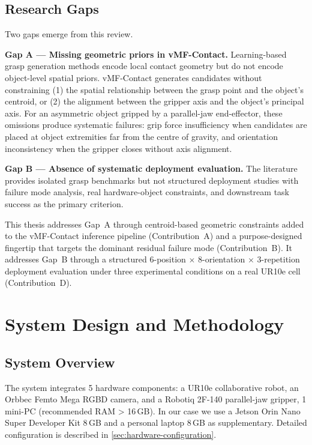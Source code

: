\documentclass[12pt, a4paper]{report}
\begin{document}
\section{Research Gaps}
\label{sec:research-gaps}

Two gaps emerge from this review.

\textbf{Gap A --- Missing geometric priors in vMF-Contact.} Learning-based grasp generation methods encode local contact geometry but do not encode object-level spatial priors. vMF-Contact generates candidates without constraining (1) the spatial relationship between the grasp point and the object's centroid, or (2) the alignment between the gripper axis and the object's principal axis. For an asymmetric object gripped by a parallel-jaw end-effector, these omissions produce systematic failures: grip force insufficiency when candidates are placed at object extremities far from the centre of gravity, and orientation inconsistency when the gripper closes without axis alignment.

\textbf{Gap B --- Absence of systematic deployment evaluation.} The literature provides isolated grasp benchmarks but not structured deployment studies with failure mode analysis, real hardware-object constraints, and downstream task success as the primary criterion.

This thesis addresses Gap~A through centroid-based geometric constraints added to the vMF-Contact inference pipeline (Contribution~A) and a purpose-designed fingertip that targets the dominant residual failure mode (Contribution~B). It addresses Gap~B through a structured 6-position $\times$ 8-orientation $\times$ 3-repetition deployment evaluation under three experimental conditions on a real UR10e cell (Contribution~D).


\chapter{System Design and Methodology}
\label{chap:system-design}

\section{System Overview}
\label{sec:system-overview}

The system integrates 5 hardware components: a UR10e collaborative robot, an Orbbec Femto Mega RGBD camera, and a Robotiq 2F-140 parallel-jaw gripper, 1 mini-PC (recommended RAM \textgreater{} 16\,GB). In our case we use a Jetson Orin Nano Super Developer Kit 8\,GB and a personal laptop 8\,GB as supplementary. Detailed configuration is described in \cref{sec:hardware-configuration}.
\end{document}

